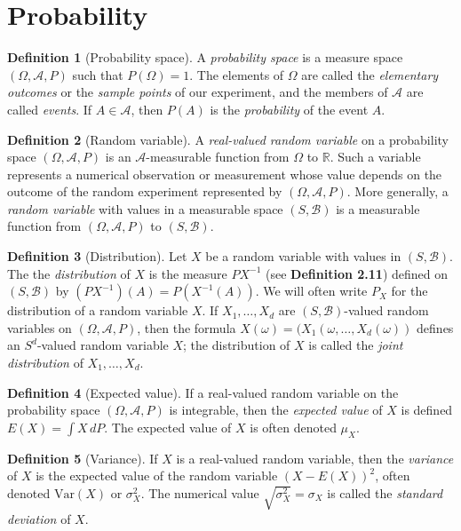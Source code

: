 \documentclass[12pt]{article}
\theoremstyle{definition}
\newtheorem{definition}{Definition}[section]
\newcommand{\real}{\mathbb{R}}   %
\newcommand{\algebra}{\mathscr{A}}
\begin{document}
\section{Probability}
\begin{definition}[Probability space]
    A \textit{probability space} is a measure space $(\Omega,\algebra,P)$ such that $P(\Omega)=1$. The elements of $\Omega$ are called the \textit{elementary outcomes} or the \textit{sample points} of our experiment, and the members of $\algebra$ are called \textit{events}. If $A\in\algebra$, then $P(A)$ is the \textit{probability} of the event $A$.
\end{definition}
\begin{definition}[Random variable]
    A \textit{real-valued random variable} on a probability space $(\Omega,\algebra,P)$ is an $\algebra$-measurable function from $\Omega$ to $\real$. Such a variable represents a numerical observation or measurement whose value depends on the outcome of the random experiment represented by $(\Omega,\algebra,P)$. More generally, a \textit{random variable} with values in a measurable space $(S,\mathscr{B})$ is a measurable function from $(\Omega,\algebra,P)$ to $(S,\mathscr{B})$.
\end{definition}
\begin{definition}[Distribution]
    Let $X$ be a random variable with values in $(S,\mathscr{B})$. The the \textit{distribution} of $X$ is the measure $PX^{-1}$ (see \textbf{Definition 2.11}) defined on $(S,\mathscr{B})$ by  $(PX^{-1})(A)=P(X^{-1}(A))$. We will often write $P_X$ for the distribution of a random variable $X$. If $X_1,\dots,X_d$ are $(S,\mathscr{B})$-valued random variables on $(\Omega,\algebra,P)$, then the formula $X(\omega)=(X_1(\omega,\dots,X_d(\omega))$ defines an $S^d$-valued random variable $X$; the distribution of $X$ is called the \textit{joint distribution} of $X_1,\dots,X_d$.
\end{definition}
\begin{definition}[Expected value]
    If a real-valued random variable on the probability space $(\Omega,\algebra,P)$ is integrable, then the \textit{expected value} of $X$ is defined $E(X)=\int X\,dP$. The expected value of $X$ is often denoted $\mu_X$.
\end{definition}
\begin{definition}[Variance]
    If $X$ is a real-valued random variable, then the \textit{variance} of $X$ is the expected value of the random variable $(X-E(X))^2$, often denoted $\text{Var}(X)$ or $\sigma_X^2$. The numerical value $\sqrt{\sigma_X^2}=\sigma_X$ is called the \textit{standard deviation} of $X$.
\end{definition}
\end{document}
